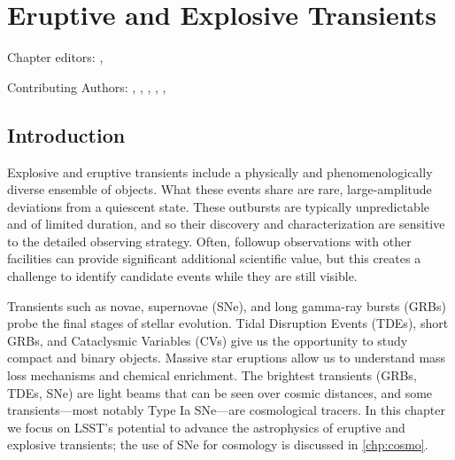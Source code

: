 
\chapter[Eruptive and Explosive Transients]{Eruptive and Explosive Transients}
\def\chpname{transients}\label{chp:\chpname}


Chapter editors:
,

Contributing Authors:
,
,
,
,
,

\section{Introduction}


Explosive and eruptive transients include a physically and
phenomenologically diverse ensemble of objects.   What these events share
are rare, large-amplitude deviations from a quiescent state.  These
outbursts are typically unpredictable and of limited duration, and so their
discovery and characterization are sensitive to the detailed observing
strategy.  Often, followup observations with other facilities can provide
significant additional scientific value, but this creates a challenge to
identify candidate events while they are still visible.

Transients such as novae, supernovae (SNe), and long gamma-ray bursts (GRBs)
probe the final stages of stellar evolution. Tidal Disruption Events
(TDEs), short GRBs, and
Cataclysmic Variables (CVs) give us the opportunity to study
compact and binary objects. Massive star eruptions allow us to understand
mass loss mechanisms and chemical enrichment. 
The brightest transients (GRBs, TDEs,
SNe) are light beams that can be seen over cosmic distances, and some
transients---most notably Type Ia SNe---are cosmological tracers.  
In this chapter we focus on LSST's potential to advance the astrophysics of
eruptive and explosive transients; the use of SNe for cosmology is
discussed in \autoref{chp:cosmo}.

